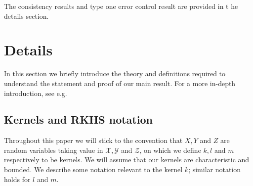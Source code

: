 \documentclass[]{article}
\begin{document}
The consistency results and type one error control result are provided in t he details section.




\section{Details} 

In this section we briefly introduce the theory and definitions required to understand the statement and proof of our main result. For a more in-depth introduction, see e.g. \cite{steinwart2008support}\cite{berlinet2011reproducing}\cite{scholkopf2002learning}

\subsection{Kernels and RKHS notation}



Throughout this paper we will stick to the convention that $X,Y$ and $Z$ are random variables taking value in $\mathcal{X}, \mathcal{Y}$ and $\mathcal{Z}$, on which we define $k, l$ and $m$ respectively to be kernels. We will assume that our kernels are characteristic and bounded. We describe some notation relevant to the kernel $k$; similar notation holds for $l$ and $m$.
\end{document}
